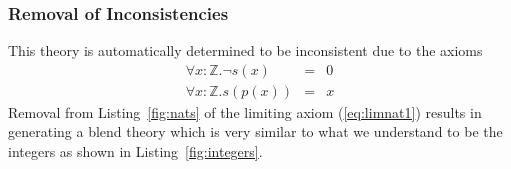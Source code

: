 \subsubsection{Removal of Inconsistencies}
This theory is automatically determined to be inconsistent due to the axioms
\begin{eqnarray}
\forall x : \mathbb{Z} . \neg s(x) &=& 0 \label{eq:limnat1}\\
\forall x : \mathbb{Z} . s(p(x)) &=& x \label{eq:sucpre}
\end{eqnarray}
Removal from Listing~\ref{fig:nats}
of the limiting axiom (\ref{eq:limnat1}) results in 
generating a blend theory 
which is very
similar to what we understand to be the integers as shown in Listing~\ref{fig:integers}.
\begin{listing}[!ht]
\begin{mdframed}

\end{mdframed}
\end{listing}
